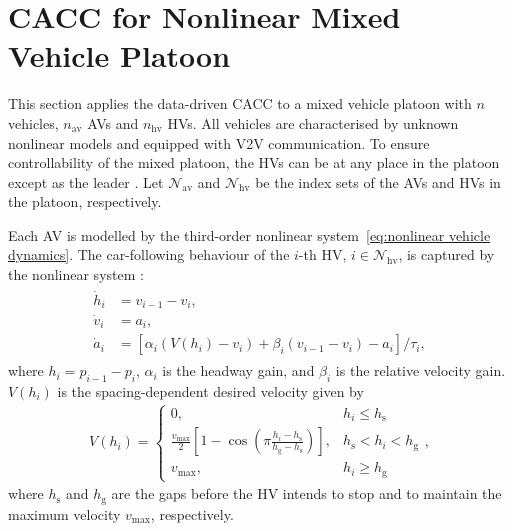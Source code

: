 \documentclass[letterpaper, 10 pt, conference]{ieeeconf}
\begin{document}
	
	
	\section{CACC for Nonlinear Mixed Vehicle Platoon}\label{subsec:mixed platoon}
	This section applies the data-driven CACC to a mixed vehicle platoon with $n$ vehicles, $n_\text{av}$ AVs and $n_\text{hv}$ HVs. All vehicles are characterised by unknown nonlinear models and equipped with V2V communication.
	To ensure controllability of the mixed platoon, the HVs can be at any place in 
	the platoon except as the leader \cite{Lan+21d}. Let $\mathcal{N}_\text{av}$ and $\mathcal{N}_\text{hv}$ be the index sets of the AVs and HVs in the platoon, 
	respectively.  
	
	Each AV is modelled by the third-order nonlinear 
	system~\eqref{eq:nonlinear vehicle dynamics}. 
	The car-following behaviour of the $i$-th HV, $i \in \mathcal{N}_\text{hv}$, is 
	captured by the nonlinear system \cite{Lan+21d}:
	\begin{align} \label{HV dynamics}
		\begin{split}
			\dot{h}_i &= v_{i-1} - v_i, \\
			\dot{v}_i &= a_i, \\
			\dot{a}_i &= \left[ \alpha_i (V(h_i) - v_i) + \beta_i 
			(v_{i-1} - v_i) - a_i \right]/\tau_i,
		\end{split}
	\end{align}
	where $h_i = p_{i-1} - p_i$, 
	$\alpha_i$ is the headway gain, and $\beta_i$ is the relative velocity gain. 
	$V(h_i)$ is the spacing-dependent desired velocity given by 
	\begin{eqnarray} \label{range policy}
		V(h_i) = \left \{
		\begin{array}{cl}
			0, & h_i \leq h_\text{s} \\
			\frac{v_\text{max}}{2} [ 1 - \cos(\pi \frac{h_i - 
				h_\text{s}}{h_\text{g} - h_\text{s}}) ], & h_\text{s} < h_i < 
			h_\text{g} \\
			v_\text{max}, & h_i \geq h_\text{g} 
		\end{array}\right.,
	\end{eqnarray}
	where $h_\text{s}$ and $h_\text{g}$ are the gaps before the 
	HV intends to stop and to maintain the maximum velocity $v_\text{max}$, 
	respectively. 
	
\end{document}
